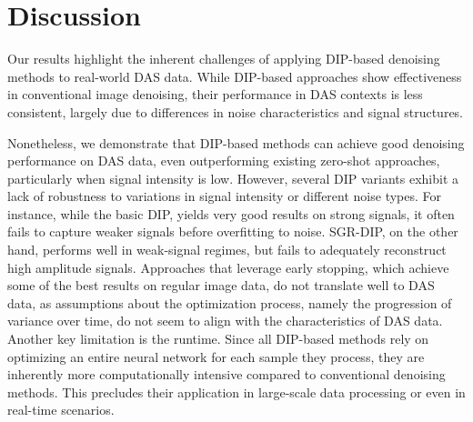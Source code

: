 \chapter{Discussion}

Our results highlight the inherent challenges of applying DIP-based denoising methods to real-world DAS data.
While DIP-based approaches show effectiveness in conventional image denoising, their performance in DAS contexts is less consistent, largely due to differences in noise characteristics and signal structures.

Nonetheless, we demonstrate that DIP-based methods can achieve good denoising performance on DAS data, even outperforming existing zero-shot approaches, particularly when signal intensity is low.
However, several DIP variants exhibit a lack of robustness to variations in signal intensity or different noise types.
For instance, while the basic DIP, yields very good results on strong signals, it often fails to capture weaker signals before overfitting to noise.
SGR-DIP, on the other hand, performs well in weak-signal regimes, but fails to adequately reconstruct high amplitude signals.
Approaches that leverage early stopping, which achieve some of the best results on regular image data, do not translate well to DAS data, as assumptions about the optimization process, namely the progression of variance over time, do not seem to align with the characteristics of DAS data.
Another key limitation is the runtime.
Since all DIP-based methods rely on optimizing an entire neural network for each sample they process, they are inherently more computationally intensive compared to conventional denoising methods.
This precludes their application in large-scale data processing or even in real-time scenarios.
